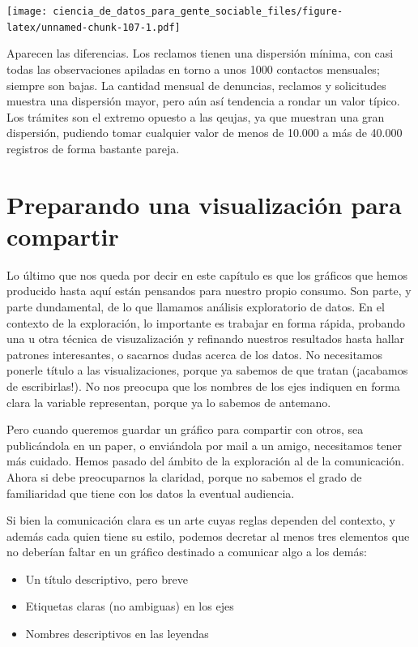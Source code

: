 \documentclass[]{book}
\providecommand{\tightlist}{%
  \setlength{\itemsep}{0pt}\setlength{\parskip}{0pt}}
\begin{document}
\texttt{[image: ciencia\_de\_datos\_para\_gente\_sociable\_files/figure-latex/unnamed-chunk-107-1.pdf]}

Aparecen las diferencias. Los reclamos tienen una dispersión mínima, con
casi todas las observaciones apiladas en torno a unos 1000 contactos
mensuales; siempre son bajas. La cantidad mensual de denuncias, reclamos
y solicitudes muestra una dispersión mayor, pero aún así tendencia a
rondar un valor típico. Los trámites son el extremo opuesto a las
qeujas, ya que muestran una gran dispersión, pudiendo tomar cualquier
valor de menos de 10.000 a más de 40.000 registros de forma bastante
pareja.

\section{Preparando una visualización para
compartir}\label{preparando-una-visualizacion-para-compartir}

Lo último que nos queda por decir en este capítulo es que los gráficos
que hemos producido hasta aquí están pensandos para nuestro propio
consumo. Son parte, y parte dundamental, de lo que llamamos análisis
exploratorio de datos. En el contexto de la exploración, lo importante
es trabajar en forma rápida, probando una u otra técnica de
visuzalización y refinando nuestros resultados hasta hallar patrones
interesantes, o sacarnos dudas acerca de los datos. No necesitamos
ponerle título a las visualizaciones, porque ya sabemos de que tratan
(¡acabamos de escribirlas!). No nos preocupa que los nombres de los ejes
indiquen en forma clara la variable representan, porque ya lo sabemos de
antemano.

Pero cuando queremos guardar un gráfico para compartir con otros, sea
publicándola en un paper, o enviándola por mail a un amigo, necesitamos
tener más cuidado. Hemos pasado del ámbito de la exploración al de la
comunicación. Ahora si debe preocuparnos la claridad, porque no sabemos
el grado de familiaridad que tiene con los datos la eventual audiencia.

Si bien la comunicación clara es un arte cuyas reglas dependen del
contexto, y además cada quien tiene su estilo, podemos decretar al menos
tres elementos que no deberían faltar en un gráfico destinado a
comunicar algo a los demás:

\begin{itemize}
\tightlist
\item
  Un título descriptivo, pero breve
\item
  Etiquetas claras (no ambiguas) en los ejes
\item
  Nombres descriptivos en las leyendas
\end{itemize}
\end{document}
